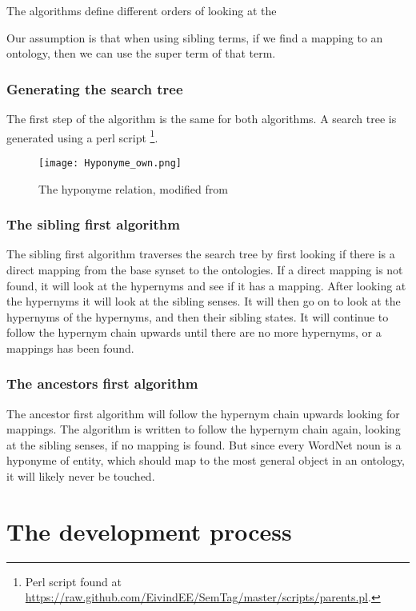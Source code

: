 The algorithms define different orders of looking at the 

Our assumption is that when using sibling terms, if we find a mapping to an ontology, 
then we can use the super term of that term.


\subsubsection{Generating the search tree}
The first step of the algorithm is the same for both algorithms.
A search tree is generated using a perl script 
\footnote{Perl script found at \url{https://raw.github.com/EivindEE/SemTag/master/scripts/parents.pl}.}.

\begin{figure}[h]
    \begin{center}
        \texttt{[image: Hyponyme\_own.png]}
        \caption{The hyponyme relation, modified from \protect \citet{Miller1990}}
        \label{Hyponyme}
    \end{center}
\end{figure}



\subsubsection{The sibling first algorithm}
The sibling first algorithm traverses the search tree by first looking if there is a direct mapping from the base synset to the ontologies. 
If a direct mapping is not found, it will look at the hypernyms and see if it has a mapping. 
After looking at the hypernyms it will look at the sibling senses. 
It will then go on to look at the hypernyms of the hypernyms, and then their sibling states. 
It will continue to follow the hypernym chain upwards until there are no more hypernyms, or a mappings has been found.

\subsubsection{The ancestors first algorithm}
The ancestor first algorithm will follow the hypernym chain upwards looking for mappings.
The algorithm is written to follow the hypernym chain again, looking at the sibling senses, if no mapping is found.
But since every WordNet noun is a hyponyme of {entity}, which should map to the most general object in an ontology,
it will likely never be touched.

\section{The development process}